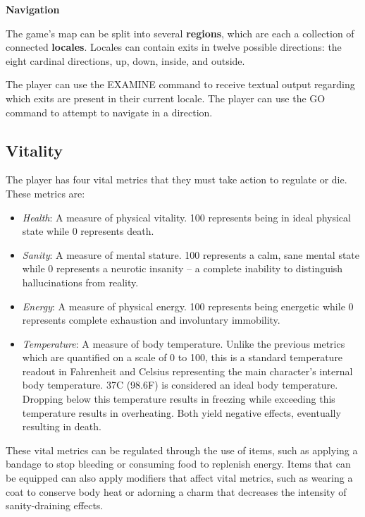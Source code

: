 \documentclass[11pt]{article}
\begin{document}
	\textbf{Navigation}
	\newline
	
	The game's map can be split into several \textbf{regions}, which are each a collection of connected \textbf{locales}. Locales can contain exits in twelve possible directions: the eight cardinal directions, up, down, inside, and outside.
	
	The player can use the EXAMINE command to receive textual output regarding which exits are present in their current locale. The player can use the GO command to attempt to navigate in a direction.
	
	\subsection{Vitality}
	
	The player has four vital metrics that they must take action to regulate or die. These metrics are:
	
	\begin{itemize}
		\item \textit{Health}: A measure of physical vitality. 100 represents being in ideal physical state while 0 represents death.
		\item \textit{Sanity}: A measure of mental stature. 100 represents a calm, sane mental state while 0 represents a neurotic insanity -- a complete inability to distinguish hallucinations from reality.
		\item \textit{Energy}: A measure of physical energy. 100 represents being energetic while 0 represents complete exhaustion and involuntary immobility.
		\item \textit{Temperature}: A measure of body temperature. Unlike the previous metrics which are quantified on a scale of 0 to 100, this is a standard temperature readout in Fahrenheit and Celsius representing the main character's internal body temperature. 37\textdegree C (98.6\textdegree F) is considered an ideal body temperature. Dropping below this temperature results in freezing while exceeding this temperature results in overheating. Both yield negative effects, eventually resulting in death.
	\end{itemize}

	These vital metrics can be regulated through the use of items, such as applying a bandage to stop bleeding or consuming food to replenish energy. Items that can be equipped can also apply modifiers that affect vital metrics, such as wearing a coat to conserve body heat or adorning a charm that decreases the intensity of sanity-draining effects.
	
\end{document}
